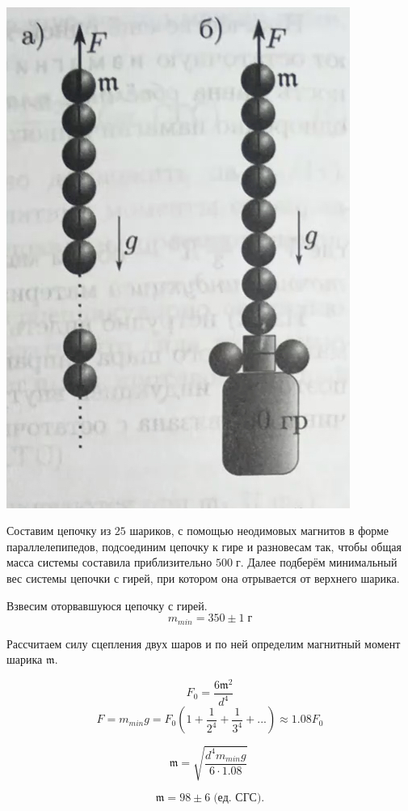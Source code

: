 \documentclass[a4paper,12pt]{article}
\begin{document}
\begin{center}
\begin{minipage}{0.4\textwidth}
\end{minipage}
\begin{minipage}{0.05\textwidth}
\
\end{minipage}
\begin{minipage}{0.4\textwidth}
\begin{center}
\includegraphics[width=0.7\linewidth]{2.jpg}\\
\end{center}
Составим цепочку из $25$ шариков, с помощью неодимовых магнитов в форме параллелепипедов, подсоединим цепочку к гире и разновесам так, чтобы общая масса системы составила приблизительно $500 \;\text{г}$. Далее подберём минимальный вес системы цепочки с гирей, при котором она отрывается от верхнего шарика.

Взвесим оторвавшуюся цепочку с гирей. $$m_{min} = 350 \pm 1 \; \text{г}$$

Рассчитаем силу сцепления двух шаров и по ней определим магнитный момент шарика $\mathfrak{m}$.

\[ F_0 = \frac{6\mathfrak{m}^2}{d^4} \] \[F = m_{min}g  = F_0(1+\frac1{2^4}+\frac1{3^4} +...)\approx 1.08 F_0 \]

\[ \mathfrak{m} = \sqrt{\frac{d^4m_{min}g}{6 \cdot 1.08}} \;\]

\[\mathfrak{m} = 98 \pm 6 \; \text{(ед. СГС)}.\]
\end{minipage}
\end{center}
\end{document}
